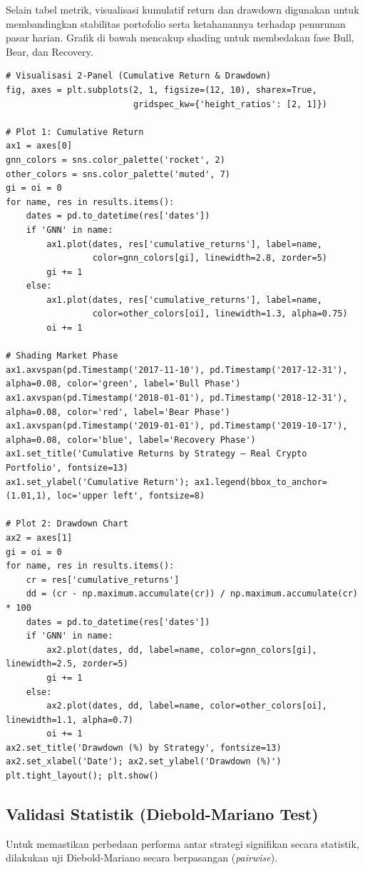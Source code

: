 \documentclass[12pt,a4paper]{article}
\begin{document}
Selain tabel metrik, visualisasi kumulatif return dan drawdown digunakan untuk membandingkan stabilitas portofolio serta ketahanannya terhadap penurunan pasar harian. Grafik di bawah mencakup shading untuk membedakan fase Bull, Bear, dan Recovery.

\begin{lstlisting}[caption={Visualisasi Cumulative Returns dan Drawdown}]
# Visualisasi 2-Panel (Cumulative Return & Drawdown)
fig, axes = plt.subplots(2, 1, figsize=(12, 10), sharex=True, 
                         gridspec_kw={'height_ratios': [2, 1]})

# Plot 1: Cumulative Return
ax1 = axes[0]
gnn_colors = sns.color_palette('rocket', 2)
other_colors = sns.color_palette('muted', 7)
gi = oi = 0
for name, res in results.items():
    dates = pd.to_datetime(res['dates'])
    if 'GNN' in name:
        ax1.plot(dates, res['cumulative_returns'], label=name,
                 color=gnn_colors[gi], linewidth=2.8, zorder=5)
        gi += 1
    else:
        ax1.plot(dates, res['cumulative_returns'], label=name,
                 color=other_colors[oi], linewidth=1.3, alpha=0.75)
        oi += 1

# Shading Market Phase
ax1.axvspan(pd.Timestamp('2017-11-10'), pd.Timestamp('2017-12-31'), alpha=0.08, color='green', label='Bull Phase')
ax1.axvspan(pd.Timestamp('2018-01-01'), pd.Timestamp('2018-12-31'), alpha=0.08, color='red', label='Bear Phase')
ax1.axvspan(pd.Timestamp('2019-01-01'), pd.Timestamp('2019-10-17'), alpha=0.08, color='blue', label='Recovery Phase')
ax1.set_title('Cumulative Returns by Strategy — Real Crypto Portfolio', fontsize=13)
ax1.set_ylabel('Cumulative Return'); ax1.legend(bbox_to_anchor=(1.01,1), loc='upper left', fontsize=8)

# Plot 2: Drawdown Chart
ax2 = axes[1]
gi = oi = 0
for name, res in results.items():
    cr = res['cumulative_returns']
    dd = (cr - np.maximum.accumulate(cr)) / np.maximum.accumulate(cr) * 100
    dates = pd.to_datetime(res['dates'])
    if 'GNN' in name:
        ax2.plot(dates, dd, label=name, color=gnn_colors[gi], linewidth=2.5, zorder=5)
        gi += 1
    else:
        ax2.plot(dates, dd, label=name, color=other_colors[oi], linewidth=1.1, alpha=0.7)
        oi += 1
ax2.set_title('Drawdown (%) by Strategy', fontsize=13)
ax2.set_xlabel('Date'); ax2.set_ylabel('Drawdown (%)')
plt.tight_layout(); plt.show()
\end{lstlisting}

\subsection{Validasi Statistik (Diebold-Mariano Test)}
Untuk memastikan perbedaan performa antar strategi signifikan secara statistik, dilakukan uji Diebold-Mariano secara berpasangan (\textit{pairwise}).
\end{document}
